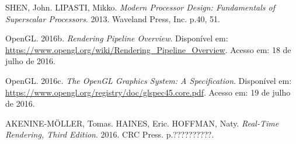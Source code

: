 \documentclass[brazil,ruledheader]{abntifes}
\begin{document}
\begin{thebibliography}{1}
SHEN, John. LIPASTI, Mikko. \textit{Modern Processor Design: Fundamentals of Superscalar Processors}. 2013. Waveland Press, Inc. p.40, 51.

OpenGL. 2016b. \textit{Rendering Pipeline Overview}. Disponível em: \url{https://www.opengl.org/wiki/Rendering_Pipeline_Overview}.
Acesso em: 18 de julho de 2016.

OpenGL. 2016c. \textit{The OpenGL Graphics System:
A Specification}. Disponível em: \url{https://www.opengl.org/registry/doc/glspec45.core.pdf}.
Acesso em: 19 de julho de 2016.

AKENINE-MÖLLER, Tomas. HAINES, Eric. HOFFMAN, Naty. \textit{Real-Time Rendering, Third Edition}. 2016. CRC Press. p.??????????.


\end{thebibliography}


\anexo
\end{document}
